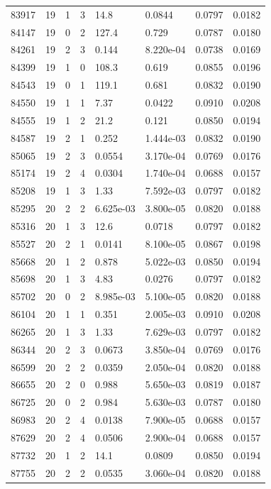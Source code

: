 \documentclass[preview]{standalone}
\begin{document}
{{{{{{{{\begin{tabular}{L{1.2cm}C{1.2cm} C{0.3cm}C{0.5cm} C{1.4cm}C{1.4cm} C{1.4cm}C{1.4cm}}
  83917  &    19  & 1     &  3 &  14.8  & 0.0844  & 0.0797 &  0.0182   \\ 
  84147  &    19  & 0     &  2 &  127.4  & 0.729  & 0.0787 &  0.0180   \\ 
  84261  &    19  & 2     &  3 &  0.144  & 8.220e-04  & 0.0738 &  0.0169   \\ 
  84399  &    19  & 1     &  0 &  108.3  & 0.619  & 0.0855 &  0.0196   \\ 
  84543  &    19  & 0     &  1 &  119.1  & 0.681  & 0.0832 &  0.0190   \\ 
  84550  &    19  & 1     &  1 &  7.37  & 0.0422  & 0.0910 &  0.0208   \\ 
  84555  &    19  & 1     &  2 &  21.2  & 0.121  & 0.0850 &  0.0194   \\ 
  84587  &    19  & 2     &  1 &  0.252  & 1.444e-03  & 0.0832 &  0.0190   \\ 
  85065  &    19  & 2     &  3 &  0.0554  & 3.170e-04  & 0.0769 &  0.0176   \\ 
  85174  &    19  & 2     &  4 &  0.0304  & 1.740e-04  & 0.0688 &  0.0157   \\ 
  85208  &    19  & 1     &  3 &  1.33  & 7.592e-03  & 0.0797 &  0.0182   \\ 
  85295  &    20  & 2     &  2 &  6.625e-03  & 3.800e-05  & 0.0820 &  0.0188   \\ 
  85316  &    20  & 1     &  3 &  12.6  & 0.0718  & 0.0797 &  0.0182   \\ 
  85527  &    20  & 2     &  1 &  0.0141  & 8.100e-05  & 0.0867 &  0.0198   \\ 
  85668  &    20  & 1     &  2 &  0.878  & 5.022e-03  & 0.0850 &  0.0194   \\ 
  85698  &    20  & 1     &  3 &  4.83  & 0.0276  & 0.0797 &  0.0182   \\ 
  85702  &    20  & 0     &  2 &  8.985e-03  & 5.100e-05  & 0.0820 &  0.0188   \\ 
  86104  &    20  & 1     &  1 &  0.351  & 2.005e-03  & 0.0910 &  0.0208   \\ 
  86265  &    20  & 1     &  3 &  1.33  & 7.629e-03  & 0.0797 &  0.0182   \\ 
  86344  &    20  & 2     &  3 &  0.0673  & 3.850e-04  & 0.0769 &  0.0176   \\ 
  86599  &    20  & 2     &  2 &  0.0359  & 2.050e-04  & 0.0820 &  0.0188   \\ 
  86655  &    20  & 2     &  0 &  0.988  & 5.650e-03  & 0.0819 &  0.0187   \\ 
  86725  &    20  & 0     &  2 &  0.984  & 5.630e-03  & 0.0787 &  0.0180   \\ 
  86983  &    20  & 2     &  4 &  0.0138  & 7.900e-05  & 0.0688 &  0.0157   \\ 
  87629  &    20  & 2     &  4 &  0.0506  & 2.900e-04  & 0.0688 &  0.0157   \\ 
  87732  &    20  & 1     &  2 &  14.1  & 0.0809  & 0.0850 &  0.0194   \\ 
  87755  &    20  & 2     &  2 &  0.0535  & 3.060e-04  & 0.0820 &  0.0188   \\ 
\hline 
\end{tabular} 

}}}}}}}}
\end{document}
